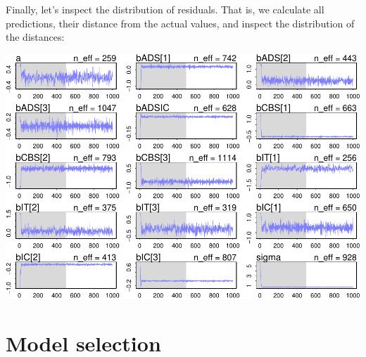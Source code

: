 \documentclass[10pt,dvipsnames,enabledeprecatedfontcommands]{scrartcl}
\newenvironment{Shaded}{\begin{snugshade}}{\end{snugshade}}
\newcommand{\KeywordTok}[1]{\textcolor[rgb]{0.13,0.29,0.53}{\textbf{#1}}}
\newcommand{\DataTypeTok}[1]{\textcolor[rgb]{0.13,0.29,0.53}{#1}}
\newcommand{\DecValTok}[1]{\textcolor[rgb]{0.00,0.00,0.81}{#1}}
\newcommand{\StringTok}[1]{\textcolor[rgb]{0.31,0.60,0.02}{#1}}
\newcommand{\OperatorTok}[1]{\textcolor[rgb]{0.81,0.36,0.00}{\textbf{#1}}}
\newcommand{\NormalTok}[1]{#1}
\begin{document}
\normalsize

Finally, let's inspect the distribution of residuals. That is, we
calculate all predictions, their distance from the actual values, and
inspect the distribution of the distances:

\vspace{1mm} \footnotesize

\begin{Shaded}
\end{Shaded}

\begin{center}\includegraphics[width=1\linewidth]{bayesianReport_files/figure-latex/unnamed-chunk-9-1} \end{center}

\normalsize

\section{Model selection}\label{model-selection}
\end{document}
